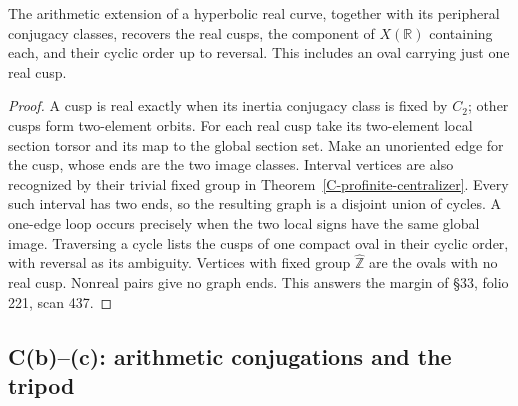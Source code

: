 \begin{proposition}
\label{C-boundary-order}
The arithmetic extension of a hyperbolic real curve,
together with its peripheral conjugacy classes,
recovers the real cusps, the component of $X(\mathbb R)$
containing each, and their cyclic order up to reversal.
This includes an oval carrying just one real cusp.
\end{proposition}
\begin{proof}
A cusp is real exactly when its inertia conjugacy class
is fixed by $C_2$; other cusps form two-element orbits.
For each real cusp take its two-element local section
torsor and its map to the global section set.
Make an unoriented edge for the cusp, whose ends are
the two image classes. Interval vertices are also
recognized by their trivial fixed group in
Theorem~\ref{C-profinite-centralizer}.
Every such interval has two ends, so the resulting
graph is a disjoint union of cycles. A one-edge loop
occurs precisely when the two local signs have the
same global image. Traversing a cycle lists the
cusps of one compact oval in their cyclic order,
with reversal as its ambiguity. Vertices with
fixed group $\widehat{\mathbb Z}$ are the ovals
with no real cusp. Nonreal pairs give no graph ends.
This answers the margin of \S33, folio 221, scan 437.
\end{proof}

\subsection{C(b)--(c): arithmetic conjugations and the tripod}


